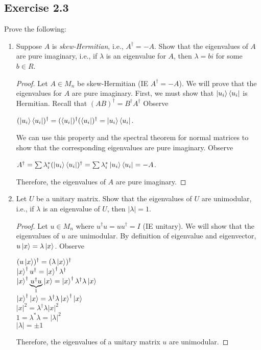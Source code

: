 \documentclass[12pt]{article}
\theoremstyle{plain}
\theoremstyle{nonumberplain}
\theoremstyle{plain}
\theoremstyle{nonumberplain}
\newtheorem{proof}{Proof.}
\newcommand\1{{\bf 1}}
\newcommand{\<}{\left\langle}
\renewcommand{\>}{\right\rangle}
\begin{document}
\subsection{Exercise 2.3}
Prove the following:
\begin{enumerate}[label=(\alph*)]
\item Suppose $A$ is \textit{skew-Hermitian}, i.e., $A^\dagger=-A$. Show that the eigenvalues of $A$ are pure imaginary, i.e., if $\lambda$ is an eigenvalue for $A$, then $\lambda = bi$ for some $b \in R$.\\
\begin{proof}
Let $A\in M_n$ be skew-Hermitian (IE $A^\dagger=-A$). We will prove that the eigenvalues for $A$ are pure imaginary. First, we must show that $\ket{u_i}\bra{u_i}$ is Hermitian. Recall that $(AB)^\dagger=B^\dagger A^\dagger$ Observe
\begin{center}
$(\ket{u_i}\bra{u_i})^\dagger=(\bra{u_i})^\dagger(\bra{u_i})^\dagger=\ket{u_i}\bra{u_i}$.
\end{center}
We can use this property and the spectral theorem for normal matrices to show that the corresponding eigenvalues are pure imaginary. Observe
\begin{center}
$A^\dagger=\sum\lambda_i^*(\ket{u_i}\bra{u_i})^\dagger=\sum\lambda_i^*\ket{u_i}\bra{u_i}=-A$.
\end{center}
Therefore, the eigenvalues of $A$ are pure imaginary.
\end{proof}

\item Let $U$ be a unitary matrix. Show that the eigenvalues of $U$ are unimodular, i.e., if $\lambda$ is an eigenvalue of $U$, then $|\lambda| = 1$.
\begin{proof}
Let $u\in M_n$ where $u^\dagger u=uu^\dagger=I$ (IE unitary). We will show that the eigenvalues of $u$ are unimodular. By definition of eigenvalue and eigenvector, $u\ket{x}=\lambda\ket{x}$. Observe
\begin{center}
$(u\ket{x})^\dagger=(\lambda\ket{x})^\dagger$\\$\ket{x}^\dagger u^\dagger=\ket{x}^\dagger \lambda^\dagger$ \\
$\ket{x}^\dagger \underbrace{\textstyle u^\dagger u }_{\mathclap{1}}\ket{x}=\ket{x}^\dagger\lambda^\dagger\lambda\ket{x}$ \\
$\ket{x}^\dagger\ket{x}=\lambda^\dagger\lambda\ket{x}^\dagger\ket{x}$ \\
$|x|^2=\lambda^\dagger\lambda |x|^2$ \\
$1=\lambda^*\lambda=|\lambda|^2$ \\
$|\lambda|=\pm 1$
\end{center}
Therefore, the eigenvalues of a unitary matrix $u$ are unimodular.
\end{proof}


\end{enumerate}
\end{document}
